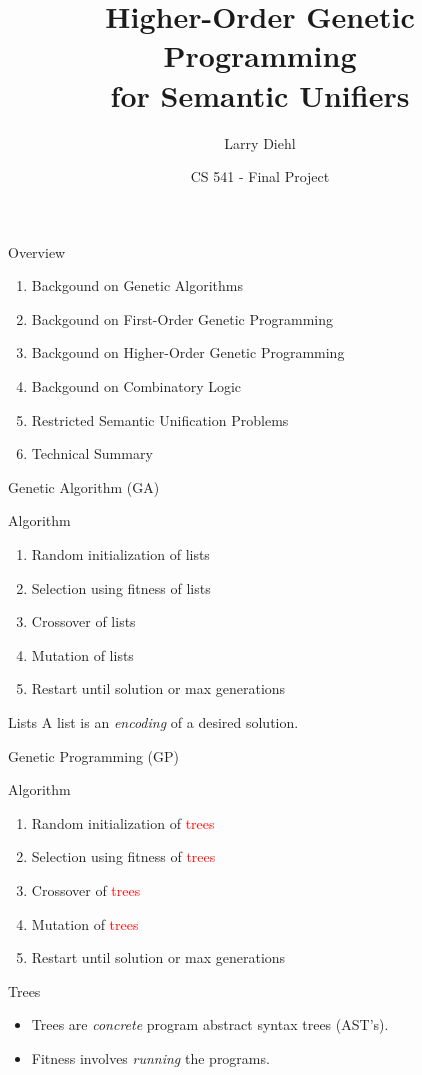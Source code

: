\documentclass[mathserif]{beamer}
\title{Higher-Order Genetic Programming \\for Semantic Unifiers}
\author{Larry Diehl}
\institute{Portland State University}
\date[Fall 2014]
{CS 541 - Final Project}
\newcommand{\diff}[1]{\textcolor{red}{#1}}
\begin{document}
\frame{\titlepage}

\begin{frame}{Overview}

\begin{enumerate}
\item Backgound on Genetic Algorithms
\item Backgound on First-Order Genetic Programming
\item Backgound on Higher-Order Genetic Programming
\item Backgound on Combinatory Logic
\item Restricted Semantic Unification Problems
\item Technical Summary
\end{enumerate}

\end{frame}



\begin{frame}{Genetic Algorithm (GA)}

\begin{block}{Algorithm}
\begin{enumerate}
\item Random initialization of lists
\item Selection using fitness of lists
\item Crossover of lists
\item Mutation of lists
\item Restart until solution or max generations
\end{enumerate}
\end{block}

\begin{block}{Lists}
A list is an \textit{encoding} of a desired solution.
\end{block}

\end{frame}

\begin{frame}{Genetic Programming (GP)}

\begin{block}{Algorithm}
\begin{enumerate}
\item Random initialization of \diff{trees}
\item Selection using fitness of \diff{trees}
\item Crossover of \diff{trees}
\item Mutation of \diff{trees}
\item Restart until solution or max generations
\end{enumerate}
\end{block}

\begin{block}{Trees}
\begin{itemize}
\item Trees are \textit{concrete} program abstract syntax trees (AST's).
\item Fitness involves \textit{running} the programs.
\end{itemize}
\end{block}

\end{frame}
\end{document}
